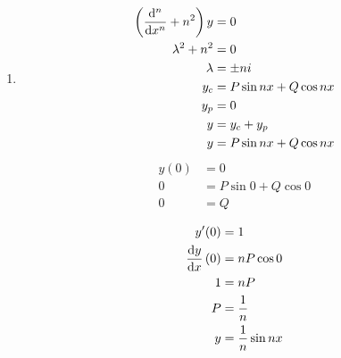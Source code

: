 \documentclass[10pt,\jkfside,a4paper]{article}
\begin{document}
\begin{enumerate}
\begin{enumerate}
\item
\begin{equation}
\begin{split}
\left(\dv[n]{x} + n^2\right)y &= 0\\
\lambda^2 + n^2 &= 0\\
\lambda &= \pm ni\\
y_c &= P\sin nx + Q\cos nx\\
y_p &= 0 \\
y &= y_c + y_ p \\
y &= P\sin nx + Q\cos nx\\
\end{split}
\end{equation}
\begin{equation}
\begin{split}
y(0) &= 0\\
0 &= P\sin 0 + Q\cos 0\\
0 &= Q\\
\end{split}
\end{equation}
\begin{equation}
\begin{split}
y'(0) &= 1\\
\dv{y}{x}\left(0\right) &= nP\cos 0\\
1 &= nP\\
P &= \frac{1}{n}\\
y &= \frac{1}{n}\sin nx\\
\end{split}
\end{equation}


\end{enumerate}
\end{enumerate}
\end{document}

